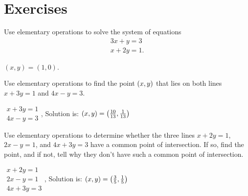 \section*{Exercises}

\begin{enumialphparenastyle}

\begin{ex}
  Use elementary operations to solve the system of equations
  \begin{equation*}
    \begin{array}{c}
      3x+y=3\\
      x+2y=1.
    \end{array}                                                                
  \end{equation*}

  \begin{sol}
    $(x,y) = (1,0)$.
  \end{sol}
\end{ex}

\begin{ex}
  Use elementary operations to find the point $\left(x,y\right)$
  that lies on both lines $x+3y=1$ and $4x-y=3$.
  \begin{sol}
    $\begin{array}{c}
       x+3y=1 \\
       4x-y=3
     \end{array}
    $, Solution is: $(x,y) = \left(\frac{10}{13},\frac{1}{13}\right)$
  \end{sol}
\end{ex}
 
\begin{ex}
  Use elementary operations to determine whether the three lines
  $x+2y=1$, $2x-y=1$, and $4x+3y=3$ have a common point of intersection.
  If so, find the point, and if not, tell why they don't have such a
  common point of intersection.
  \begin{sol}
    $\begin{array}{c}
       x+2y=1 \\
       2x-y=1 \\
       4x+3y=3
     \end{array}
    $, Solution is: $(x,y) = \left(\frac{3}{5},\frac{1}{5}\right)$
  \end{sol}
\end{ex}


\end{enumialphparenastyle}
